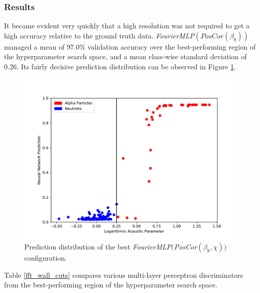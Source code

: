 \documentclass[10pt]{article}
\begin{document}
\subsubsection{Results}

It became evident very quickly that a high resolution was not required to get a high accuracy relative to the ground truth data. {\it FourierMLP}$(PosCor(\beta_{8}))$ managed a mean of 97.0\% validation accuracy over the best-performing region of the hyperparameter search space, and a mean class-wise standard deviation of 0.26. Its fairly decisive prediction distribution can be observed in Figure \ref{banded_no_pos_input_hist}.

\begin{figure}[h]
    \centering
    \includegraphics[width=\textwidth]{banded_no_pos_input_hist}
    \caption{\label{banded_no_pos_input_hist} Prediction distribution of the best {\it FourierMLP}$(${\it PosCor}$(\beta_{8}, \chi))$ configuration.}
\end{figure}

Table \ref{fft_wall_cuts} compares various multi-layer perceptron discriminators from the best-performing region of the hyperparameter search space.
\end{document}
